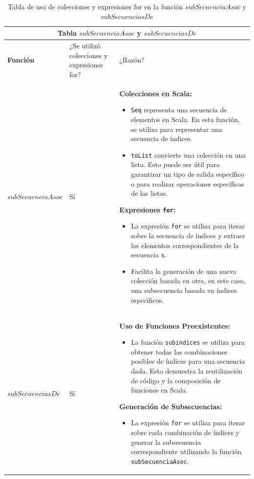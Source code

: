 \documentclass[12pt, a4paper]{article}
\begin{document}
\begin{table}[H]
    \scriptsize
   \begin{tabular}{ |p{4cm}|p{3cm}|p{5.5cm}|  }
    \hline
    \multicolumn{3}{|c|}{Tabla $subSecuenciaAsoc$ y $subSecuenciasDe$} \\
    \hline
    \textbf{Función}& ¿Se utilizó colecciones y expresiones for?  & ¿Razón?\\
    \hline
    $subSecuenciaAsoc$ & Sí &  
      \textbf{Colecciones en Scala:} 
      \begin{itemize}
          \item \texttt{Seq} representa una secuencia de elementos en Scala. En esta función, se utiliza para representar una secuencia de índices.
          \item \texttt{toList} convierte una colección en una lista. Esto puede ser útil para garantizar un tipo de salida específico o para realizar operaciones específicas de las listas.
      \end{itemize}
      
       \textbf{Expresiones \texttt{for}:} 
      \begin{itemize}
          \item La expresión \texttt{for} se utiliza para iterar sobre la secuencia de índices y extraer los elementos correspondientes de la secuencia \texttt{s}.
          \item Facilita la generación de una nueva colección basada en otra, en este caso, una subsecuencia basada en índices específicos.
      \end{itemize}
  \\
     \hline

    
    $subSecuenciasDe$ & Sí &  
       \textbf{Uso de Funciones Preexistentes:}
      \begin{itemize}
          \item La función \texttt{subindices} se utiliza para obtener todas las combinaciones posibles de índices para una secuencia dada. Esto demuestra la reutilización de código y la composición de funciones en Scala.
      \end{itemize}
      
       \textbf{Generación de Subsecuencias:}
      \begin{itemize}
          \item La expresión \texttt{for} se utiliza para iterar sobre cada combinación de índices y generar la subsecuencia correspondiente utilizando la función \texttt{subSecuenciaAsoc}.
      \end{itemize}
      \\ \hline
   \end{tabular}
   
   \centering
   \caption{Tabla de uso de colecciones y expresiones for en la función $subSecuenciaAsoc$ y $subSecuenciasDe$}
   \end{table}
\end{document}
